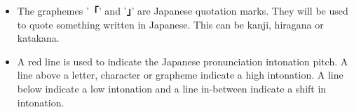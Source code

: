 \begin{itemize}
%

    \item[\jquotesingleja{\ldots}]

            The graphemes '\textbf{「}' and '\textbf{」}' are Japanese
            quotation marks. They will be used to quote something written in
            Japanese.  This can be kanji, hiragana or katakana.


    \item[{\jpitch[br]{{ }}\jpitch[lt]{{ }}}]

            A red line is used to indicate the Japanese pronunciation
            intonation pitch. A line above a letter, character or grapheme
            indicate a high intonation. A line below indicate a low intonation
            and a line in-between indicate a shift in intonation.



\end{itemize}
